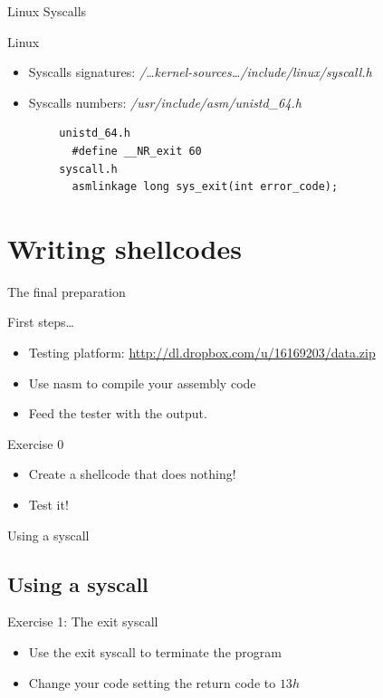 \begin{frame}[fragile]{Linux Syscalls}
	\begin{block}{Linux}
		\begin{itemize}
			\item Syscalls signatures: \emph{/\ldots{}kernel-sources\ldots/include/linux/syscall.h}
			\item Syscalls numbers: \emph{/usr/include/asm/unistd\_64.h}
		\end{itemize}
	\end{block}
	\acode
	\begin{lstlisting}
		unistd_64.h
		  #define __NR_exit 60
		syscall.h
		  asmlinkage long sys_exit(int error_code);
	\end{lstlisting}
\end{frame}


\section{Writing shellcodes}
\begin{frame}{The final preparation}
	\begin{block}{First steps\ldots}
		\begin{itemize}
			\item Testing platform: \url{http://dl.dropbox.com/u/16169203/data.zip}
			\item Use nasm to compile your assembly code
			\item Feed the tester with the output.
		\end{itemize}
	\end{block}
	\begin{block}{Exercise 0}
		\begin{itemize}
			\item \alert{Create a shellcode that does nothing!}
			\item Test it!
		\end{itemize}
	\end{block}
\end{frame}

\begin{frame}{Using a syscall}
	\subsection{Using a syscall}
	\begin{block}{Exercise 1: The exit syscall}
		\begin{itemize}
			\item \alert{Use the exit syscall to terminate the program}
			\item Change your code setting the return code to $13h$
		\end{itemize}
	\end{block}
\end{frame}


